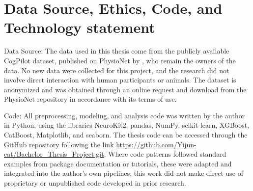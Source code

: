 \documentclass[11pt, a4paper]{article}
\begin{document}


\begin{abstract}
This study examines how accurately pilot performance during a virtual reality ILS landing task can be predicted in near real time using tree-based machine learning models trained on multimodal physiological and simulator-derived features. The goal is to assess whether such models can support automated, continuous monitoring in pilot training. Analyses use the CogPilot dataset, which contains synchronized ECG, respiration, and aircraft-behavior data. Heart-rate and respiration features were extracted from sliding 10-second windows and combined with aircraft state variables to form second-by-second observations. Three tree-based multi-output regressors were trained to predict four continuous performance-error labels (glide slope, localizer, airspeed, and total tracking error) and were evaluated using two generalization strategies. Models achieved high predictive accuracy when the feature set included lagged component error inputs, whereas they yielded only modest but non-negligible performance when limited to physiological and simulator-derived features. These findings indicate that tree-based regression models can underpin automated, short-horizon performance monitoring in VR-based pilot training, while physiology-driven models are particularly relevant when recent performance data are unavailable, delayed, or noisy.
\end{abstract}

\section{Data Source, Ethics, Code, and Technology statement}
Data Source:
The data used in this thesis come from the publicly available CogPilot dataset, published on PhysioNet \cite{goldberger-2000} by \cite{rao-2022}, who remain the owners of the data. No new data were collected for this project, and the research did not involve direct interaction with human participants or animals. The dataset is anonymized and was obtained through an online request and download from the PhysioNet repository in accordance with its terms of use.

Code:
All preprocessing, modeling, and analysis code was written by the author in Python, using the libraries NeuroKit2, pandas, NumPy, scikit‑learn, XGBoost, CatBoost, Matplotlib, and seaborn. The thesis code can be accessed through the GitHub repository following the link \href{https://github.com/Yijun-cat/Bachelor_Thesis_Project.git}{https://github.com/Yijun-cat/Bachelor\_Thesis\_Project.git}. Where code patterns followed standard examples from package documentation or tutorials, these were adapted and integrated into the author’s own pipelines; this work did not make direct use of proprietary or unpublished code developed in prior research.
\end{document}
